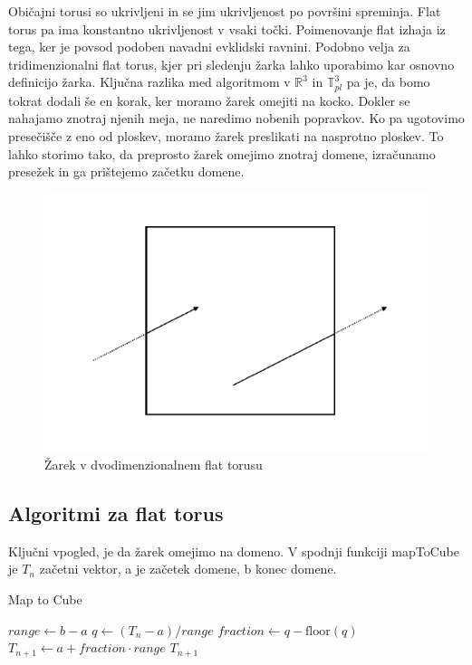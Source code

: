 \documentclass[titlepage]{article}
\begin{document}
Običajni torusi so ukrivljeni in se jim ukrivljenost po površini spreminja. Flat torus pa ima konstantno ukrivljenost v vsaki točki. Poimenovanje flat izhaja iz tega, ker je povsod podoben navadni evklidski ravnini. Podobno velja za tridimenzionalni flat torus, kjer pri sledenju žarka lahko uporabimo kar osnovno definicijo žarka. Ključna razlika med algoritmom v \( \mathbb{R}^3 \) in \( \mathbb{T}^3_{pl} \) pa je, da bomo tokrat dodali še en korak, ker moramo žarek omejiti na kocko. Dokler se nahajamo znotraj njenih meja, ne naredimo nobenih popravkov. Ko pa ugotovimo presečišče z eno od ploskev, moramo žarek preslikati na nasprotno ploskev. To lahko storimo tako, da preprosto žarek omejimo znotraj domene, izračunamo presežek in ga prištejemo začetku domene.

\begin{figure}[H]
    \centering
    \includegraphics[width=0.5\linewidth]{Images/flat_torus_zrcaljenje.png}
    \caption{Žarek v dvodimenzionalnem flat torusu}
    \label{Slika:Žarek v dvodimenzionalnem flat torusu}
\end{figure}
\subsection{Algoritmi za flat torus}
Ključni vpogled, je da žarek omejimo na domeno. V spodnji funkciji mapToCube je $T_{n}$ začetni vektor, a je začetek domene, b konec domene.
\begin{algorithm}[H]
\caption{Map to Cube}\label{alg:mapToCube}
\begin{algorithmic}[1]
    \State $range \gets b - a$
    \State $q \gets (T_{n} - a) / range$
    \State $fraction \gets q - \text{floor}(q)$
    \State $T_{n+1} \gets a + fraction \cdot range$
    \State \Return $T_{n+1}$
\EndFunction
\end{algorithmic}
\end{algorithm}
\end{document}
